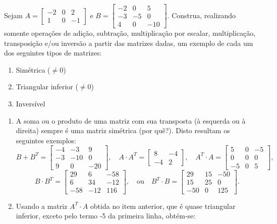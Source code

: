 \documentclass[12pt,a4paper]{article}
\begin{document}
\begin{ExerciseList}
\Exercise[title={2,5}] Sejam $A = \begin{bmatrix}
-2 & 0 & 2\\
 1 & 0 & -1
\end{bmatrix}$ e $B = \begin{bmatrix}
-2 &  0 &  5\\
-3 & -5 &  0\\
 4 &  0 & -10
\end{bmatrix}$. Construa, realizando somente operações de adição, subtração, multiplicação por escalar, multiplicação, transposição e/ou inversão a partir das matrizes dadas, um exemplo de cada um dos seguintes tipos de matrizes:
\begin{multicols}{3}
\begin{enumerate}
\item Simétrica ($\neq 0$)
\item Triangular inferior ($\neq 0$)
\item Inversível
\end{enumerate}
\end{multicols}
\Answer
\begin{enumerate}
\item A soma ou o produto de uma matriz com sua transposta (à esquerda ou à direita) sempre é uma matriz simétrica (por quê?). Disto resultam os seguintes exemplos:
\[
B + B^T
=\begin{bmatrix}
-4 & -3 & 9\\-3 & -10 & 0\\9 & 0 & -20
\end{bmatrix},\quad
A \cdot A^T
=\begin{bmatrix}
8 & -4\\-4 & 2
\end{bmatrix},\quad
A^T \cdot A
=\begin{bmatrix}
5 & 0 & -5\\0 & 0 & 0\\-5 & 0 & 5
\end{bmatrix},
\]
\[
B \cdot B^T
=\begin{bmatrix}
29 & 6 & -58\\6 & 34 & -12\\-58 & -12 & 116
\end{bmatrix},\quad\text{ou}\quad
B^T \cdot B
=\begin{bmatrix}
29 & 15 & -50\\15 & 25 & 0\\-50 & 0 & 125
\end{bmatrix}.
\]
\item Usando a matriz $A^T\cdot A$ obtida no item anterior, que é quase triangular inferior, exceto pelo termo -5 da primeira linha, obtém-se:

\end{enumerate}
\end{ExerciseList}
\end{document}
